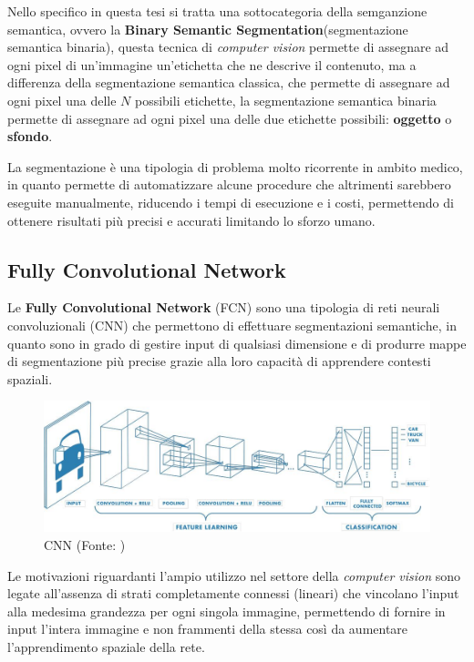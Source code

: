 Nello specifico in questa tesi si tratta una sottocategoria della semganzione semantica,
ovvero la \textbf{Binary Semantic Segmentation}(segmentazione semantica
binaria), questa tecnica di \textit{computer vision} permette di assegnare ad ogni pixel
di un'immagine un'etichetta che ne descrive il contenuto, ma a differenza della
segmentazione semantica classica, che permette di assegnare ad ogni pixel una delle $N$
possibili etichette, la segmentazione semantica binaria permette di assegnare ad ogni
pixel una delle due etichette possibili: \textbf{oggetto} o \textbf{sfondo}.

La segmentazione \`e una tipologia di problema molto ricorrente in ambito medico,
in quanto permette di automatizzare alcune procedure che altrimenti sarebbero
eseguite manualmente, riducendo i tempi di esecuzione e i costi,
permettendo di ottenere risultati pi\`u precisi e accurati limitando lo sforzo umano.


\subsection{Fully Convolutional Network}

Le \textbf{Fully Convolutional Network} (FCN) \cite{long2015fully} sono una tipologia di reti neurali convoluzionali (CNN) che permettono di effettuare segmentazioni semantiche, in quanto sono in grado di gestire input di qualsiasi dimensione e di produrre mappe di segmentazione pi\`u precise grazie alla loro capacit\`a di apprendere contesti spaziali.


\begin{figure}[!ht]
	\begin{adjustbox}{width=0.6\columnwidth, center}
		\includegraphics{./images/cnn.png}
	\end{adjustbox}
	\caption{CNN (Fonte: \cite{cnn_example})}
	\label{fig:cnn}
\end{figure}

Le motivazioni riguardanti l'ampio utilizzo nel settore della \textit{computer vision}
sono legate all'assenza di strati completamente connessi (lineari) che vincolano
l'input alla medesima grandezza per ogni singola immagine, permettendo di fornire in input l'intera immagine e non frammenti della stessa così da aumentare l'apprendimento spaziale della rete.

